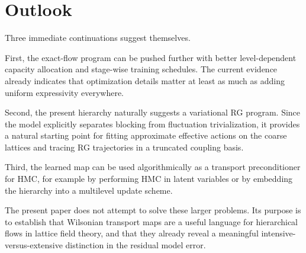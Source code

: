 \documentclass[aps,prd,preprint,nofootinbib,superscriptaddress,longbibliography]{revtex4-2}
\begin{document}
\section{Outlook}
\label{sec:outlook}

Three immediate continuations suggest themselves.

First, the exact-flow program can be pushed further with better level-dependent
capacity allocation and stage-wise training schedules. The current evidence
already indicates that optimization details matter at least as much as adding
uniform expressivity everywhere.

Second, the present hierarchy naturally suggests a variational RG program. Since
the model explicitly separates blocking from fluctuation trivialization, it
provides a natural starting point for fitting approximate effective actions on
the coarse lattices and tracing RG trajectories in a truncated coupling basis.

Third, the learned map can be used algorithmically as a transport
preconditioner for HMC, for example by performing HMC in latent variables
\cite{Hoffman2019NeuTra} or by embedding the hierarchy into a multilevel update
scheme.

The present paper does not attempt to solve these larger problems. Its purpose
is to establish that Wilsonian transport maps are a useful language for
hierarchical flows in lattice field theory, and that they already reveal a
meaningful intensive-versus-extensive distinction in the residual model error.



\end{document}
